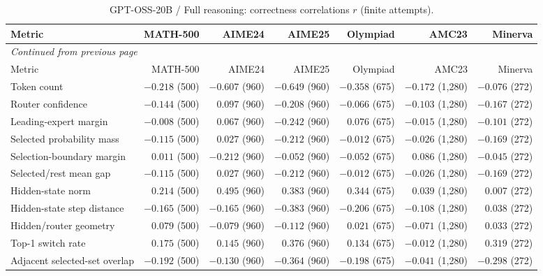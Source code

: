 \begingroup\scriptsize\setlength{\tabcolsep}{4pt}
\begin{longtable}{@{}lrrrrrr@{}}
\caption{GPT-OSS-20B / Full reasoning: correctness correlations $r$ (finite attempts).}\label{tab:multi-gptoss-reasoning}\\
\toprule
Metric & MATH-500 & AIME24 & AIME25 & Olympiad & AMC23 & Minerva \\
\midrule\endfirsthead
\multicolumn{7}{l}{\textit{Continued from previous page}}\\
\toprule
Metric & MATH-500 & AIME24 & AIME25 & Olympiad & AMC23 & Minerva \\
\midrule\endhead
\bottomrule\endfoot
Token count & $-0.218$ (500) & $-0.607$ (960) & $-0.649$ (960) & $-0.358$ (675) & $-0.172$ (1,280) & $-0.076$ (272) \\
Router confidence & $-0.144$ (500) & $0.097$ (960) & $-0.208$ (960) & $-0.066$ (675) & $-0.103$ (1,280) & $-0.167$ (272) \\
Leading-expert margin & $-0.008$ (500) & $0.067$ (960) & $-0.242$ (960) & $0.076$ (675) & $-0.015$ (1,280) & $-0.101$ (272) \\
Selected probability mass & $-0.115$ (500) & $0.027$ (960) & $-0.212$ (960) & $-0.012$ (675) & $-0.026$ (1,280) & $-0.169$ (272) \\
Selection-boundary margin & $0.011$ (500) & $-0.212$ (960) & $-0.052$ (960) & $-0.052$ (675) & $0.086$ (1,280) & $-0.045$ (272) \\
Selected/rest mean gap & $-0.115$ (500) & $0.027$ (960) & $-0.212$ (960) & $-0.012$ (675) & $-0.026$ (1,280) & $-0.169$ (272) \\
Hidden-state norm & $0.214$ (500) & $0.495$ (960) & $0.383$ (960) & $0.344$ (675) & $0.039$ (1,280) & $0.007$ (272) \\
Hidden-state step distance & $-0.165$ (500) & $-0.165$ (960) & $-0.383$ (960) & $-0.206$ (675) & $-0.108$ (1,280) & $0.038$ (272) \\
Hidden/router geometry & $0.079$ (500) & $-0.079$ (960) & $-0.112$ (960) & $0.021$ (675) & $-0.071$ (1,280) & $0.033$ (272) \\
Top-1 switch rate & $0.175$ (500) & $0.145$ (960) & $0.376$ (960) & $0.134$ (675) & $-0.012$ (1,280) & $0.319$ (272) \\
Adjacent selected-set overlap & $-0.192$ (500) & $-0.130$ (960) & $-0.364$ (960) & $-0.198$ (675) & $-0.041$ (1,280) & $-0.298$ (272) \\
\end{longtable}\endgroup

